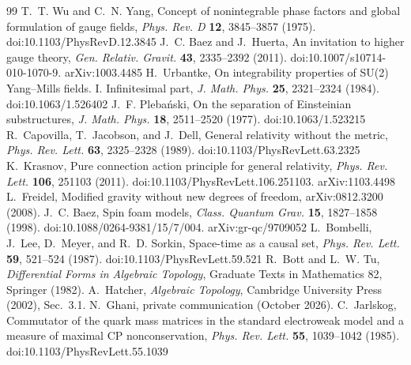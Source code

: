 \documentclass[10pt]{article}
\begin{document}
\begin{thebibliography}{99}
 T.~T. Wu and C.~N. Yang, Concept of nonintegrable phase factors and global formulation of gauge fields, \textit{Phys. Rev. D} \textbf{12}, 3845--3857 (1975). doi:10.1103/PhysRevD.12.3845
 J.~C. Baez and J.~Huerta, An invitation to higher gauge theory, \textit{Gen. Relativ. Gravit.} \textbf{43}, 2335--2392 (2011). doi:10.1007/s10714-010-1070-9. arXiv:1003.4485
 H.~Urbantke, On integrability properties of SU(2) Yang--Mills fields. I. Infinitesimal part, \textit{J. Math. Phys.} \textbf{25}, 2321--2324 (1984). doi:10.1063/1.526402
 J.~F. Pleba\'nski, On the separation of Einsteinian substructures, \textit{J. Math. Phys.} \textbf{18}, 2511--2520 (1977). doi:10.1063/1.523215
 R.~Capovilla, T.~Jacobson, and J.~Dell, General relativity without the metric, \textit{Phys. Rev. Lett.} \textbf{63}, 2325--2328 (1989). doi:10.1103/PhysRevLett.63.2325
 K.~Krasnov, Pure connection action principle for general relativity, \textit{Phys. Rev. Lett.} \textbf{106}, 251103 (2011). doi:10.1103/PhysRevLett.106.251103. arXiv:1103.4498
 L.~Freidel, Modified gravity without new degrees of freedom, arXiv:0812.3200 (2008).
 J.~C. Baez, Spin foam models, \textit{Class. Quantum Grav.} \textbf{15}, 1827--1858 (1998). doi:10.1088/0264-9381/15/7/004. arXiv:gr-qc/9709052
 L.~Bombelli, J.~Lee, D.~Meyer, and R.~D. Sorkin, Space-time as a causal set, \textit{Phys. Rev. Lett.} \textbf{59}, 521--524 (1987). doi:10.1103/PhysRevLett.59.521
 R.~Bott and L.~W. Tu, \textit{Differential Forms in Algebraic Topology}, Graduate Texts in Mathematics 82, Springer (1982).
 A.~Hatcher, \textit{Algebraic Topology}, Cambridge University Press (2002), Sec.~3.1.
 N.~Ghani, private communication (October 2026).
 C.~Jarlskog, Commutator of the quark mass matrices in the standard electroweak model and a measure of maximal CP nonconservation, \textit{Phys. Rev. Lett.} \textbf{55}, 1039--1042 (1985). doi:10.1103/PhysRevLett.55.1039
\end{thebibliography}
\end{document}
